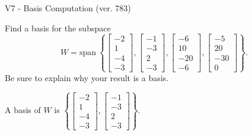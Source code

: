\begin{exercise}
  \begin{exerciseTitle}V7 - Basis Computation (ver. 783)\end{exerciseTitle}
  \begin{exerciseStatement}
    Find a basis for the subspace 
\[W=\mathrm{span}\ \left\{\left[\begin{array}{r}
-2 \\
1 \\
-4 \\
-3
\end{array}\right] , \left[\begin{array}{r}
-1 \\
-3 \\
2 \\
-3
\end{array}\right] , \left[\begin{array}{r}
-6 \\
10 \\
-20 \\
-6
\end{array}\right] , \left[\begin{array}{r}
-5 \\
20 \\
-30 \\
0
\end{array}\right]\right\}.\]
 Be sure to explain why your result is a basis.


  \end{exerciseStatement}
  \begin{exerciseAnswer}
   A basis of \(W\) is  \(\left\{\left[\begin{array}{r}
-2 \\
1 \\
-4 \\
-3
\end{array}\right] , \left[\begin{array}{r}
-1 \\
-3 \\
2 \\
-3
\end{array}\right]\right\}\).
  


  \end{exerciseAnswer}
\end{exercise}